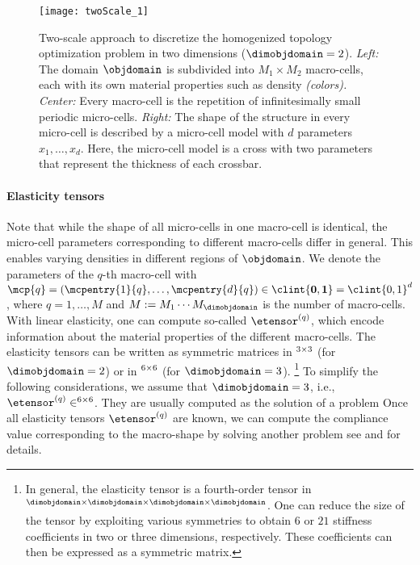 \begin{figure}
  \texttt{[image: twoScale\_1]}%
  \caption[%
    Two-scale approach for topology optimization%
  ]{%
    Two-scale approach to discretize the homogenized topology
    optimization problem in two dimensions ($\dimobjdomain = 2$).
    \emph{Left:} The domain $\objdomain$ is subdivided into $M_1 \times M_2$
    macro-cells, each with its own material properties such as density
    \emph{(colors).}
    \emph{Center:} Every macro-cell is the repetition of infinitesimally small
    periodic micro-cells.
    \emph{Right:} The shape of the structure in every micro-cell is
    described by a micro-cell model with $d$ parameters $x_1, \dotsc, x_d$.
    Here, the micro-cell model is a cross with two parameters
    that represent the thickness of each crossbar.%
  }%
  \label{fig:twoScale}%
\end{figure}

\paragraph{Elasticity tensors}

Note that while the shape of all micro-cells in one macro-cell is identical,
the micro-cell parameters corresponding to different macro-cells differ
in general.
This enables varying densities in different regions of $\objdomain$.
We denote the parameters of the $q$-th macro-cell
with $\mcp{q} = (\mcpentry{1}{q}, \dotsc, \mcpentry{d}{q}) \in
\clint{\*0, \*1} = \clint{0, 1}^d$,
where $q = 1, \dotsc, M$ and
$M := M_1 \dotsm M_{\dimobjdomain}$ is the number of macro-cells.
With linear elasticity,
one can compute so-called  $\etensor^{(q)}$,
which encode information about the material properties
of the different macro-cells.
The elasticity tensors can be written as symmetric matrices
in $\real^{3 \times 3}$ (for $\dimobjdomain = 2$) or
in $\real^{6 \times 6}$ (for $\dimobjdomain = 3$).%
\footnote{%
  In general, the elasticity tensor is a fourth-order tensor in
  $\real^{\dimobjdomain \times \dimobjdomain \times \dimobjdomain \times \dimobjdomain}$.
  One can reduce the size of the tensor by exploiting various symmetries
  \cite{Huebner14Mehrdimensionale}
  to obtain $6$ or $21$ stiffness coefficients
  in two or three dimensions, respectively.
  These coefficients can then be expressed as a symmetric matrix.%
}
To simplify the following considerations,
we assume that $\dimobjdomain = 3$, i.e.,
$\etensor^{(q)} \in \real^{6 \times 6}$.
They are usually computed as the solution of a \fem problem
Once all elasticity tensors $\etensor^{(q)}$ are known,
we can compute the compliance value corresponding to the macro-shape
by solving another \fem problem 
see \cite{Allaire04Topology} and \cite{Huebner14Mehrdimensionale}
for details.

